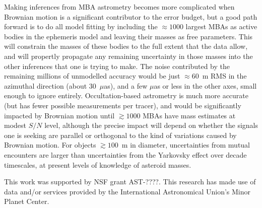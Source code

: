 \documentclass[linenumbers, onecolumn]{aastex631}
\begin{document}
Making inferences from MBA astrometry becomes more complicated when Brownian motion is a significant contributor to the error budget, but a good path forward is to do all model fitting by including the $\approx1000$ largest MBAs as active bodies in the ephemeris model and leaving their masses as free parameters.  This will constrain the masses of these bodies to the full extent that the data allow, and will propertly propagate any remaining uncertainty in those masses into the other inferences that one is trying to make.  The noise contributed by the remaining millions of unmodelled accuracy would be just $\approx60$~m RMS in the azimuthal direction (about 30~$\mu$as), and a few $\mu$as or less in the other axes, small enough to ignore entirely.  
Occultation-based astrometry is much more accurate (but has fewer possible measurements per tracer), and would be significantly impacted by Brownian motion until $\gtrsim1000$ MBAs have mass estimates at modest $S/N$ level, although the precise impact will depend on whether the signals one is seeking are parallel or orthogonal to the kind of variations caused by Brownian motion.  For objects $\gtrsim100$~m in diameter, uncertainties from mutual encounters are larger than uncertainties from the Yarkovsky effect over decade timescales, at present levels of knowledge of asteroid masses.


\begin{acknowledgments}
  This work was supported by NSF grant AST-????.
  This research has made use of data and/or services provided by the International Astronomical Union's Minor Planet Center. 
\end{acknowledgments}

\newpage


\end{document}

